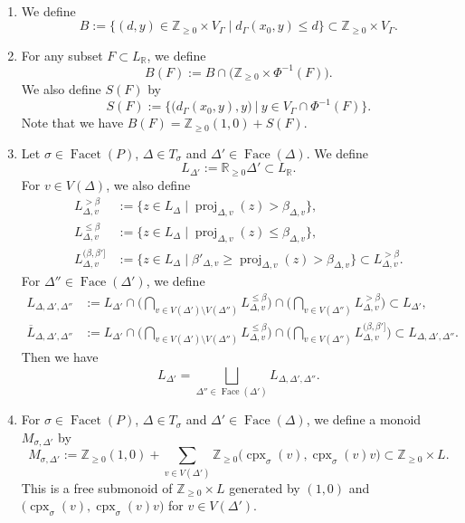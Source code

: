 \begin{defn}\label{defi:M} \,
\begin{enumerate}
\item 
We define 
\[
B := \{ (d,y) \in \mathbb{Z}_{\ge 0} \times V_{\Gamma} \mid d_{\Gamma}(x_0, y) \le d \} \subset \mathbb{Z}_{\ge 0} \times V_{\Gamma}. 
\]

\item
For any subset $F \subset L_{\mathbb{R}}$, we define 
\[
B(F) := B \cap  \bigl( \mathbb{Z}_{\ge 0} \times \Phi^{-1}(F) \bigr). 
\]
We also define $S(F)$ by 
\[
S(F) := \bigl\{ \bigl( d_{\Gamma}(x_0, y), y \bigr) \ \big| \  y \in V_{\Gamma} \cap \Phi ^{-1}(F)  \bigr\}. 
\]
Note that we have $B(F) = \mathbb{Z}_{\ge 0}(1,0) + S(F)$. 

\item 
Let $\sigma \in \operatorname{Facet}(P)$, $\Delta \in T_{\sigma}$ and $\Delta ' \in \operatorname{Face}(\Delta)$. 
We define 
\[
L_{\Delta '} := \mathbb{R}_{\ge 0}\Delta ' \subset L_{\mathbb{R}}. 
\]
For $v \in V(\Delta)$, we also define 
\begin{align*}
L_{\Delta, v} ^{> \beta} 
&:= \{ z \in L_{\Delta} \mid \operatorname{proj}_{\Delta, v}(z) > \beta _{\Delta, v} \}, \\
L_{\Delta, v} ^{\le \beta} 
&:= \{ z \in L_{\Delta} \mid \operatorname{proj}_{\Delta, v}(z) \le \beta _{\Delta, v} \}, \\
L_{\Delta, v} ^{(\beta, \beta']} 
&:= \{ z \in L_{\Delta} \mid  \beta' _{\Delta, v}  \ge \operatorname{proj}_{\Delta, v}(z) > \beta _{\Delta, v} \} \subset L_{\Delta, v} ^{> \beta}. 
\end{align*}
For $\Delta '' \in \operatorname{Face}(\Delta ')$, we define  
\begin{align*}
L_{\Delta, \Delta ', \Delta''}
&:= L_{\Delta '}
\cap \Biggl( \bigcap _{v \in V(\Delta ') \setminus V(\Delta '')} L_{\Delta, v} ^{\le \beta} \Biggr)
\cap \Biggl( \bigcap _{v \in V(\Delta '')} L_{\Delta, v} ^{> \beta} \Biggr)
\subset L_{\Delta '}, \\
\overline{L}_{\Delta, \Delta ', \Delta''} 
&:= L_{\Delta '}
\cap \Biggl( \bigcap _{v \in V(\Delta ') \setminus V(\Delta '')} L_{\Delta, v} ^{\le \beta} \Biggr) 
\cap \Biggl( \bigcap _{v \in V(\Delta '')} L_{\Delta, v} ^{(\beta, \beta']} \Biggr)
\subset L_{\Delta, \Delta ', \Delta''}. 
\end{align*}
Then we have 
\[
L_{\Delta '} = \bigsqcup _{\Delta '' \in \operatorname{Face}(\Delta ')} L_{\Delta, \Delta ', \Delta''}. 
\]

\item 
For $\sigma \in \operatorname{Facet}(P)$, $\Delta \in T_{\sigma}$ and $\Delta ' \in \operatorname{Face}(\Delta)$, 
we define a monoid $M_{\sigma, \Delta '}$ by 
\[
M_{\sigma, \Delta '} := \mathbb{Z}_{\ge 0}(1,0) + 
\sum _{v \in V(\Delta ')} \mathbb{Z}_{\ge 0} \bigl( \operatorname{cpx}_{\sigma}(v), \operatorname{cpx}_{\sigma}(v) v \bigr) 
\subset \mathbb{Z} _{\ge 0} \times L. 
\]
This is a free submonoid of $\mathbb{Z} _{\ge 0} \times L$ generated by $(1,0)$ and 
$\bigl( \operatorname{cpx}_{\sigma}(v), \operatorname{cpx}_{\sigma}(v) v \bigr)$ for $v \in V(\Delta ')$. 
\end{enumerate}
\end{defn}

